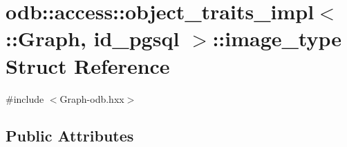 \hypertarget{structodb_1_1access_1_1object__traits__impl_3_01_1_1_graph_00_01id__pgsql_01_4_1_1image__type}{}\section{odb\+:\+:access\+:\+:object\+\_\+traits\+\_\+impl$<$ \+:\+:Graph, id\+\_\+pgsql $>$\+:\+:image\+\_\+type Struct Reference}
\label{structodb_1_1access_1_1object__traits__impl_3_01_1_1_graph_00_01id__pgsql_01_4_1_1image__type}


{\ttfamily \#include $<$Graph-\/odb.\+hxx$>$}

\subsection*{Public Attributes}
